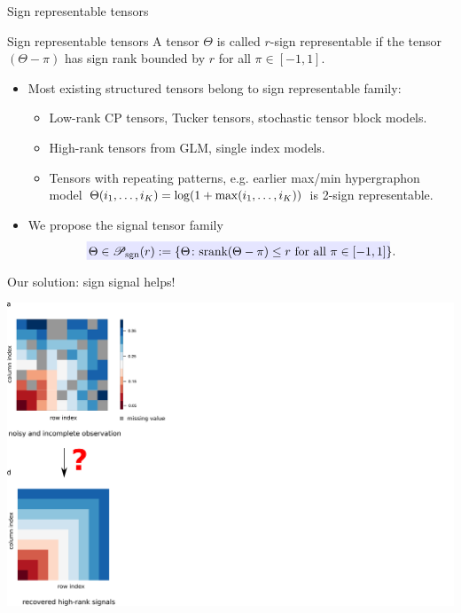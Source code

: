 \documentclass[10pt, mathserif]{beamer} %
\theoremstyle{definition}
\theoremstyle{plain}
\def\caliP{\mathscr{P}_{\textup{sgn}}}
\def\caliP{\mathscr{P}_{\textup{sgn}}}
\begin{document}
\begin{frame}{Sign representable tensors}
    \begin{block}{Sign representable tensors} 
A tensor $\Theta$ is called {\color{red}$r$-sign representable} if the tensor $(\Theta-\pi)$ has sign rank bounded by $r$ for all $\pi\in[-1,1].$ 
    \end{block}
    \begin{itemize}
   \item Most existing structured tensors belong to sign representable family:
    \begin{itemize}
      \item {\color{red}Low-rank} CP tensors, Tucker tensors, stochastic tensor block models.
       \item {\color{red}High-rank} tensors from GLM, single index models. 
        \item {\color{red}Tensors with repeating patterns}, e.g. earlier max/min hypergraphon model $\small \Theta(i_1,\ldots,i_K) = \log(1+\max(i_1,\ldots,i_K))$ is 2-sign representable.
    \end{itemize} 
    
       \item We propose the signal tensor family
       \begin{align}
         \rlap{\textcolor{blue!10}{\rule[-\dp\strutbox]{250pt}{\baselineskip}}}\,  \Theta\in\caliP(r):=\{\Theta\colon\text{srank}(\Theta-\pi)\leq r \text{ for all } \pi\in[-1,1]\}.
       \end{align}
      \end{itemize}
\end{frame}


\begin{frame}{Our solution: sign signal helps!}
 
     \begin{center}
     \includegraphics[width =\textwidth]{Figures/mainidea_step1.pdf}
        \end{center}
   \end{frame}
\end{document}
